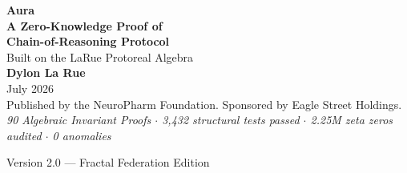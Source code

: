 \documentclass[12pt,a4paper]{article}
\begin{document}

\begin{titlepage}
\centering
\vspace*{3cm}

{\Huge \textbf{Aura}}\\[0.8cm]
{\LARGE \textbf{A Zero-Knowledge Proof of\\Chain-of-Reasoning Protocol}}\\[1.5cm]
{\large Built on the LaRue Protoreal Algebra}\\[2cm]
{\Large \textbf{Dylon La Rue}}\\[0.5cm]
{\large July 2026}\\[1cm]
{\small Published by the NeuroPharm Foundation. Sponsored by Eagle Street Holdings.}\\[2cm]
\textit{90 Algebraic Invariant Proofs $\cdot$ 3,432 structural tests passed $\cdot$ 2.25M zeta zeros audited $\cdot$ 0 anomalies}

\vfill
{\small Version 2.0 --- Fractal Federation Edition}
\end{titlepage}
\end{document}
